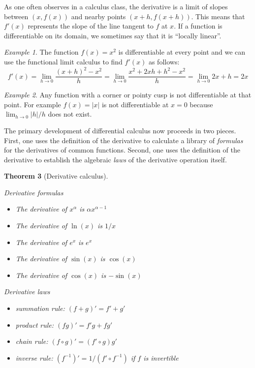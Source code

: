 \documentclass[11pt,oneside]{amsbook}
\theoremstyle{definition}
\theoremstyle{plain}
\newtheorem{thm}{Theorem}[section]
\theoremstyle{definition}
\theoremstyle{remark}
\newtheorem{example}[thm]{Example}
\numberwithin{equation}{section}
\numberwithin{figure}{section}
\begin{document}
As one often observes in a calculus class, the derivative is a limit of slopes between $(x,f(x))$ and nearby points $(x+h,f(x+h))$. This means that $f'(x)$ represents the slope of the line tangent to $f$ at $x$. If a function is differentiable on its domain, we sometimes say that it is ``locally linear''.

\begin{example}
  The function $f(x)=x^2$ is differentiable at every point and we can use the functional limit calculus to find $f'(x)$ as follows:
  \[f'(x)=\lim_{h\to0}\frac{(x+h)^2-x^2}{h}
  =\lim_{h\to0}\frac{x^2+2xh+h^2-x^2}{h}=\lim_{h\to0}2x+h=2x
  \]
\end{example}

\begin{example}
  Any function with a corner or pointy cusp is not differentiable at that point. For example $f(x)=|x|$ is not differentiable at $x=0$ because $\lim_{h\to0}|h|/h$ does not exist.
\end{example}

The primary development of differential calculus now proceeds in two pieces. First, one uses the definition of the derivative to calculate a library of \emph{formulas} for the derivatives of common functions. Second, one uses the definition of the derivative to establish the algebraic \emph{laws} of the derivative operation itself.

\begin{thm}[Derivative calculus]\ 

  Derivative formulas
  \begin{itemize}
  \item The derivative of $x^\alpha$ is $\alpha x^{\alpha-1}$
  \item The derivative of $\ln(x)$ is $1/x$
  \item The derivative of $e^x$ is $e^x$
  \item The derivative of $\sin(x)$ is $\cos(x)$
  \item The derivative of $\cos(x)$ is $-\sin(x)$
  \end{itemize}

  Derivative laws
  \begin{itemize}
  \item summation rule: $(f+g)'=f'+g'$
  \item product rule: $(fg)'=f'g+fg'$
  \item chain rule: $(f\circ g)'=(f'\circ g)g'$
  \item inverse rule: $(f^{-1})'=1/(f'\circ f^{-1})$ if $f$ is invertible
  \end{itemize}
\end{thm}
\end{document}
